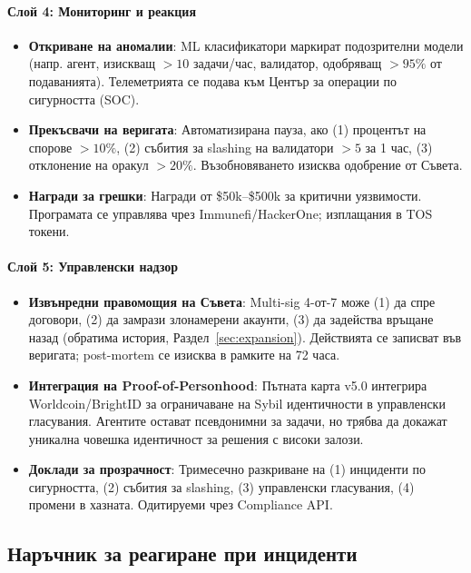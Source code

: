\documentclass[11pt]{article}
\begin{document}
\paragraph{Слой 4: Мониторинг и реакция}
\begin{itemize}[noitemsep]
  \item \textbf{Откриване на аномалии}: ML класификатори маркират подозрителни модели (напр. агент, изискващ $>10$ задачи/час, валидатор, одобряващ $>95\%$ от подаванията). Телеметрията се подава към Център за операции по сигурността (SOC).
  \item \textbf{Прекъсвачи на веригата}: Автоматизирана пауза, ако (1) процентът на спорове $>10\%$, (2) събития за slashing на валидатори $>5$ за 1 час, (3) отклонение на оракул $>20\%$. Възобновяването изисква одобрение от Съвета.
  \item \textbf{Награди за грешки}: Награди от \$50k--\$500k за критични уязвимости. Програмата се управлява чрез Immunefi/HackerOne; изплащания в TOS токени.
\end{itemize}

\paragraph{Слой 5: Управленски надзор}
\begin{itemize}[noitemsep]
  \item \textbf{Извънредни правомощия на Съвета}: Multi-sig 4-от-7 може (1) да спре договори, (2) да замрази злонамерени акаунти, (3) да задейства връщане назад (обратима история, Раздел~\ref{sec:expansion}). Действията се записват във веригата; post-mortem се изисква в рамките на 72 часа.
  \item \textbf{Интеграция на Proof-of-Personhood}: Пътната карта v5.0 интегрира Worldcoin/BrightID за ограничаване на Sybil идентичности в управленски гласувания. Агентите остават псевдонимни за задачи, но трябва да докажат уникална човешка идентичност за решения с високи залози.
  \item \textbf{Доклади за прозрачност}: Тримесечно разкриване на (1) инциденти по сигурността, (2) събития за slashing, (3) управленски гласувания, (4) промени в хазната. Одитируеми чрез Compliance API.
\end{itemize}

\subsection{Наръчник за реагиране при инциденти}
\end{document}
